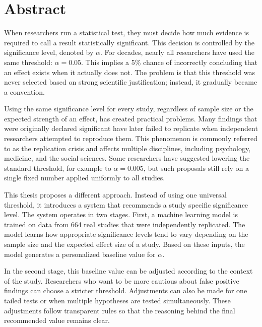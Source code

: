\chapter*{Abstract}
	
	When researchers run a statistical test, they must decide how much evidence is required to call a result statistically significant. This decision is controlled by the significance level, denoted by $\alpha$. For decades, nearly all researchers have used the same threshold: $\alpha = 0.05$. This implies a 5\% chance of incorrectly concluding that an effect exists when it actually does not. The problem is that this threshold was never selected based on strong scientific justification; instead, it gradually became a convention.
	
	Using the same significance level for every study, regardless of sample size or the expected strength of an effect, has created practical problems. Many findings that were originally declared significant have later failed to replicate when independent researchers attempted to reproduce them. This phenomenon is commonly referred to as the replication crisis and affects multiple disciplines, including psychology, medicine, and the social sciences. Some researchers have suggested lowering the standard threshold, for example to $\alpha = 0.005$, but such proposals still rely on a single fixed number applied uniformly to all studies.
	
	This thesis proposes a different approach. Instead of using one universal threshold, it introduces a system that recommends a study specific significance level. The system operates in two stages. First, a machine learning model is trained on data from 664 real studies that were independently replicated. The model learns how appropriate significance levels tend to vary depending on the sample size and the expected effect size of a study. Based on these inputs, the model generates a personalized baseline value for $\alpha$.
	
	In the second stage, this baseline value can be adjusted according to the context of the study. Researchers who want to be more cautious about false positive findings can choose a stricter threshold. Adjustments can also be made for one tailed tests or when multiple hypotheses are tested simultaneously. These adjustments follow transparent rules so that the reasoning behind the final recommended value remains clear.
	

